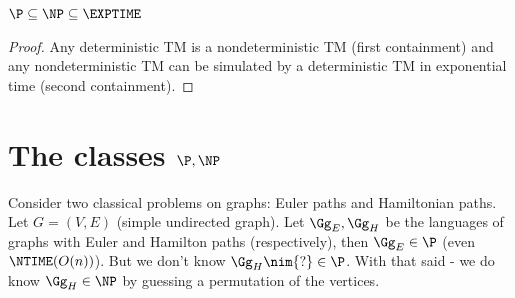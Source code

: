 \begin{blueBox}
	\begin{thm}
		$\P\subseteq\NP\subseteq\EXPTIME$
	\end{thm}
\end{blueBox}
\begin{proof}
	Any deterministic TM is a nondeterministic TM (first containment) and any nondeterministic TM can be simulated by a deterministic TM in exponential time (second containment).
\end{proof}
\section{The classes $\P,\NP$}
Consider two classical problems on graphs: Euler paths and Hamiltonian paths. Let $G = (V,E)$ (simple undirected graph). Let $\Gg_E, \Gg_H$ be the languages of graphs with Euler and Hamilton paths (respectively), then $\Gg_E\in \P$ (even $\NTIME(O(n))$). But we don't know $\Gg_H\nim{?}\in \P$. With that said - we do know $\Gg_H\in \NP$ by guessing a permutation of the vertices.
